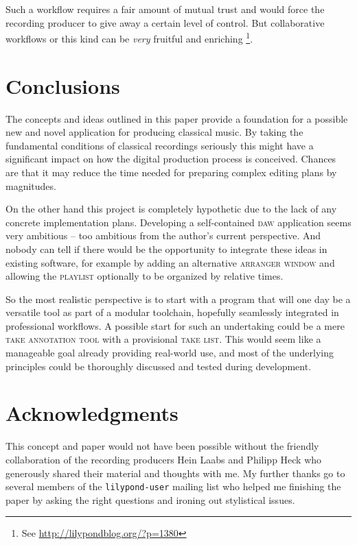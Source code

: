 \documentclass[11pt,a4paper]{article}
\newcommand*{\term}[1]{\textsc{#1}}
\begin{document}
Such a workflow requires a fair amount of mutual trust and would force the
recording producer to give away a certain level of control.
But collaborative workflows or this kind can be \emph{very} fruitful and
enriching%
\footnote{See \url{http://lilypondblog.org/?p=1380}}.


\section{Conclusions}

The concepts and ideas outlined in this paper provide a foundation for a
possible new and novel application for producing classical music. By taking
the fundamental conditions of classical recordings seriously this might have
a significant impact on how the digital production process is conceived.
Chances are that it may reduce the time needed for preparing complex editing
plans by magnitudes.

On the other hand this project is completely hypothetic due to the lack of
any concrete implementation plans. Developing a self-contained \textsc{daw}
application seems very ambitious -- too ambitious from the author's current
perspective. And nobody can tell if there would be the opportunity to 
integrate these ideas in existing software, for example by adding an alternative
\term{arranger window} and allowing the \term{playlist} optionally to be
organized by relative times.

So the most realistic perspective is to start with a program that will one day
be a versatile tool as part of a modular toolchain, hopefully seamlessly
integrated in professional workflows. A possible start for such an undertaking
could be a mere \term{take annotation tool} with a provisional \term{take list}.
This would seem like a manageable goal already providing real-world use, and
most of the underlying principles could be thoroughly discussed and tested
during development. 

\section{Acknowledgments}

This concept and paper would not have been possible without the friendly collaboration
of the recording producers Hein Laabs and Philipp Heck who generously shared their
material and thoughts with me. My further thanks go to several members of the
\texttt{lilypond-user} mailing list who helped me finishing the paper by asking
the right questions and ironing out stylistical issues. 
\end{document}
